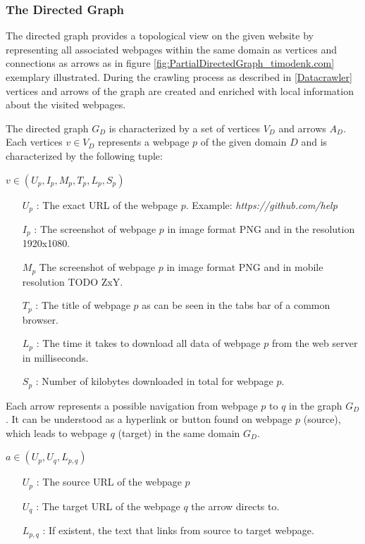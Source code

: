 \documentclass{article}
\begin{document}
\subsubsection{The Directed Graph}
The directed graph provides a topological view on the given website by representing all associated webpages within the same domain as vertices and connections as arrows as in figure \ref{fig:PartialDirectedGraph_timodenk.com} exemplary illustrated. During the crawling process as described in \ref{Datacrawler} vertices and arrows of the graph are created and enriched with local information about the visited webpages.

The directed graph $G_D$ is characterized by a set of vertices $V_D$ and arrows $A_D$. Each vertices $v \in V_D$ represents a webpage $p$ of the given domain $D$ and is characterized by the following tuple:

\begin{center}
	$v \in (U_p, I_p, M_p,T_p, L_p, S_p)$
\begin{itemize}
	\item[$ U_p$] : The exact URL of the webpage $p$. Example: \textit{https://github.com/help}
	\item[$I_p$] : The screenshot of webpage $p$ in image format PNG and in the resolution 1920x1080.
	\item[$M_p$] The screenshot of webpage $p$ in image format PNG and in mobile resolution TODO ZxY.
	\item[$T_p$] : The title of webpage $p$ as can be seen in the tabs bar of a common browser.
	\item[$L_p$] : The time it takes to download all data of webpage $p$ from the web server in milliseconds.
	\item[$S_p$] : Number of kilobytes downloaded in total for webpage $p$.
\end{itemize}
\end{center}

Each arrow represents a possible navigation from webpage $p$ to $q$ in the graph $G_D$. It can be understood as a hyperlink or button found on webpage $p$ (source), which leads to webpage $q$ (target) in the same domain $G_D$. 

\begin{center}
	$a \in (U_p, U_q, L_{p,q})$
	\begin{itemize}
		\item[$U_p$] : The source URL of the webpage $p$
		\item[$U_q$] : The target URL of the webpage $q$ the arrow directs to.
		\item[$L_{p,q}$] : If existent, the text that links from source to target webpage. 
	\end{itemize}
\end{center}
\end{document}
